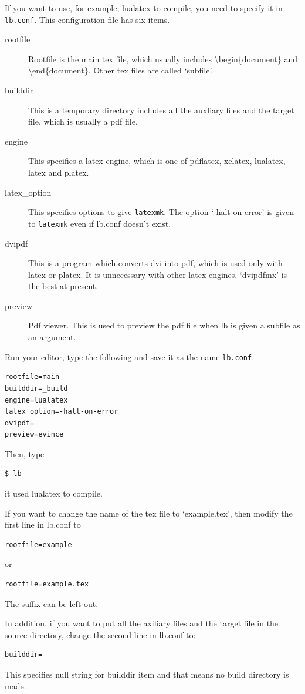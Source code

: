 If you want to use, for example, lualatex to compile, you need to specify it in \verb|lb.conf|.
This configuration file has six items.
\begin{description}
\item[rootfile] Rootfile is the main tex file, which usually includes {\textbackslash}begin\{document\} and {\textbackslash}end\{document\}. Other tex files are called `subfile'.
\item[builddir] This is a temporary directory includes all the auxliary files and the target file, which is usually a pdf file.
\item[engine] This specifies a latex engine, which is one of pdflatex, xelatex, lualatex, latex and platex.
\item[latex\_option] This specifies options to give \verb|latexmk|. The option `-halt-on-error' is given to \verb|latexmk| even if lb.conf doesn't exist.
\item[dvipdf] This is a program which converts dvi into pdf, which is used only with latex or platex. It is unnecessary with other latex engines. `dvipdfmx' is the best at present.
\item[preview] Pdf viewer. This is used to preview the pdf file when lb is given a subfile as an argument.
\end{description}

Run your editor, type the following and save it as the name \verb|lb.conf|.
\begin{verbatim}
rootfile=main
builddir=_build
engine=lualatex
latex_option=-halt-on-error
dvipdf=
preview=evince
\end{verbatim}
Then, type
\begin{verbatim}
$ lb
\end{verbatim}
it used lualatex to compile.

If you want to change the name of the tex file to `example.tex', then modify the first line in lb.conf to
\begin{verbatim}
rootfile=example
\end{verbatim}
or
\begin{verbatim}
rootfile=example.tex
\end{verbatim}
The suffix can be left out.

In addition, if you want to put all the axiliary files and the target file in the source directory, change the second line in lb.conf to:
\begin{verbatim}
builddir=
\end{verbatim}
This specifies null string for builddir item and that means no build directory is made.

